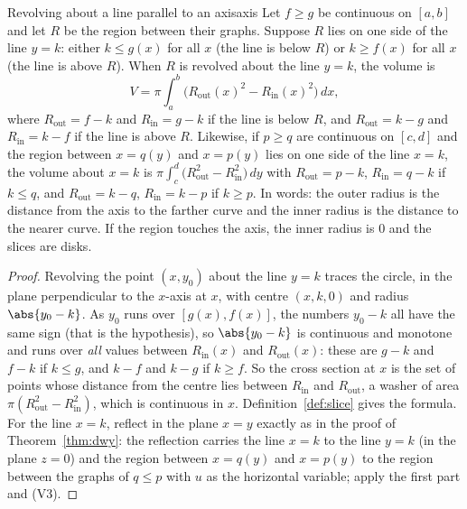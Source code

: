 \documentclass[11pt]{article}
\begin{document}
\begin{thm}{Revolving about a line parallel to an axis}{axis}
Let $f\ge g$ be continuous on $[a,b]$ and let $R$ be the region between their graphs. Suppose $R$ lies on one side of the line $y=k$: either $k\le g(x)$ for all $x$ (the line is below $R$) or $k\ge f(x)$ for all $x$ (the line is above $R$). When $R$ is revolved about the line $y=k$, the volume is
\[
V=\pi\int_a^b\bigl(R_{\mathrm{out}}(x)^2-R_{\mathrm{in}}(x)^2\bigr)\,dx ,
\]
where $R_{\mathrm{out}}=f-k$ and $R_{\mathrm{in}}=g-k$ if the line is below $R$, and $R_{\mathrm{out}}=k-g$ and $R_{\mathrm{in}}=k-f$ if the line is above $R$. Likewise, if $p\ge q$ are continuous on $[c,d]$ and the region between $x=q(y)$ and $x=p(y)$ lies on one side of the line $x=k$, the volume about $x=k$ is $\pi\int_c^d\bigl(R_{\mathrm{out}}^2-R_{\mathrm{in}}^2\bigr)\,dy$ with $R_{\mathrm{out}}=p-k$, $R_{\mathrm{in}}=q-k$ if $k\le q$, and $R_{\mathrm{out}}=k-q$, $R_{\mathrm{in}}=k-p$ if $k\ge p$. In words: the outer radius is the distance from the axis to the farther curve and the inner radius is the distance to the nearer curve. If the region touches the axis, the inner radius is $0$ and the slices are disks.
\end{thm}
\begin{proof}
Revolving the point $(x,y_0)$ about the line $y=k$ traces the circle, in the plane perpendicular to the $x$-axis at $x$, with centre $(x,k,0)$ and radius $\abs{y_0-k}$. As $y_0$ runs over $[g(x),f(x)]$, the numbers $y_0-k$ all have the same sign (that is the hypothesis), so $\abs{y_0-k}$ is continuous and monotone and runs over \emph{all} values between $R_{\mathrm{in}}(x)$ and $R_{\mathrm{out}}(x)$: these are $g-k$ and $f-k$ if $k\le g$, and $k-f$ and $k-g$ if $k\ge f$. So the cross section at $x$ is the set of points whose distance from the centre lies between $R_{\mathrm{in}}$ and $R_{\mathrm{out}}$, a washer of area $\pi(R_{\mathrm{out}}^2-R_{\mathrm{in}}^2)$, which is continuous in $x$. Definition~\ref{def:slice} gives the formula. For the line $x=k$, reflect in the plane $x=y$ exactly as in the proof of Theorem~\ref{thm:dwy}: the reflection carries the line $x=k$ to the line $y=k$ (in the plane $z=0$) and the region between $x=q(y)$ and $x=p(y)$ to the region between the graphs of $q\le p$ with $u$ as the horizontal variable; apply the first part and (V3).
\end{proof}
\end{document}
